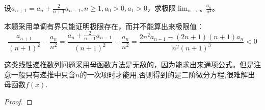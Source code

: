 \documentclass[../../main.tex]{subfiles}%
\begin{document}
\begin{example}
设\(a_{n + 1}=a_n+\frac{2}{n + 1}a_{n - 1},n\geqslant 1,a_0>0,a_1>0\)，求极限\(\lim_{n\rightarrow\infty}\frac{a_n}{n^2}\)。
\end{example}
\begin{remark}
本题采用单调有界只能证明极限存在，而并不能算出来极限值：
\[
\frac{a_{n + 1}}{(n + 1)^2}-\frac{a_n}{n^2}=\frac{a_n+\frac{2}{n + 1}a_{n - 1}}{(n + 1)^2}-\frac{a_n}{n^2}=\frac{2n^2a_{n - 1}-(2n + 1)(n + 1)a_n}{n^2(n + 1)^3}<0
\]
\end{remark}
\begin{note}
这类线性递推数列问题采用母函数方法是无敌的，因为能求出来通项公式。但是注意一般只有递推中只含$n$的一次项时才能用,否则得到的是二阶微分方程,很难解出母函数$f(x)$.
\end{note}
\begin{proof}


\end{proof}
\end{document}
